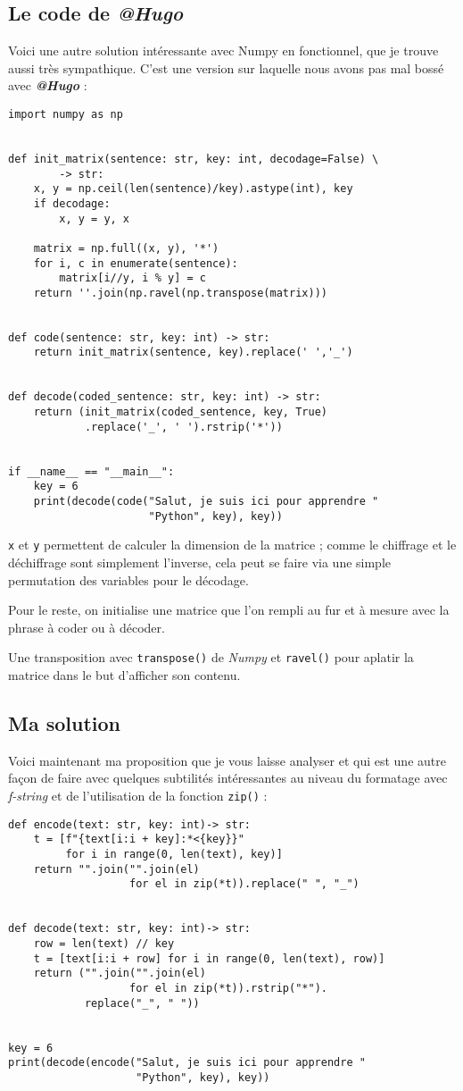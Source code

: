 \subsection*{Le code de \textbf{\textit{@Hugo}}}
Voici une autre solution intéressante avec Numpy en fonctionnel, que je trouve aussi très sympathique. C'est une version sur laquelle nous avons pas mal bossé avec \textbf{\textit{@Hugo}} :
\begin{lstlisting}
import numpy as np


def init_matrix(sentence: str, key: int, decodage=False) \
        -> str:
    x, y = np.ceil(len(sentence)/key).astype(int), key
    if decodage:
        x, y = y, x

    matrix = np.full((x, y), '*')
    for i, c in enumerate(sentence):
        matrix[i//y, i % y] = c
    return ''.join(np.ravel(np.transpose(matrix)))


def code(sentence: str, key: int) -> str:
    return init_matrix(sentence, key).replace(' ','_')


def decode(coded_sentence: str, key: int) -> str:
    return (init_matrix(coded_sentence, key, True)
            .replace('_', ' ').rstrip('*'))


if __name__ == "__main__":
    key = 6
    print(decode(code("Salut, je suis ici pour apprendre "
                      "Python", key), key))
\end{lstlisting}
\medskip

\texttt{x} et \texttt{y} permettent de calculer la dimension de la matrice ; comme le chiffrage et le déchiffrage sont simplement l'inverse, cela peut se faire via une simple permutation des variables pour le décodage.
\medskip

Pour le reste, on initialise une matrice que l'on rempli au fur et à mesure avec la phrase à coder ou à décoder.
\medskip

Une transposition avec \texttt{transpose()} de \textit{Numpy} et \texttt{ravel()} pour aplatir la matrice dans le but d'afficher son contenu.
\medskip

\subsection*{Ma solution}
Voici maintenant ma proposition que je vous laisse analyser et qui est une autre façon de faire avec quelques subtilités intéressantes au niveau du formatage avec \textit{f-string} et de l'utilisation de la fonction \texttt{zip()} :
\begin{lstlisting}
def encode(text: str, key: int)-> str:
    t = [f"{text[i:i + key]:*<{key}}"
         for i in range(0, len(text), key)]
    return "".join("".join(el)
                   for el in zip(*t)).replace(" ", "_")


def decode(text: str, key: int)-> str:
    row = len(text) // key
    t = [text[i:i + row] for i in range(0, len(text), row)]
    return ("".join("".join(el)
                   for el in zip(*t)).rstrip("*").
            replace("_", " "))


key = 6
print(decode(encode("Salut, je suis ici pour apprendre "
                    "Python", key), key))
\end{lstlisting}
\medskip

